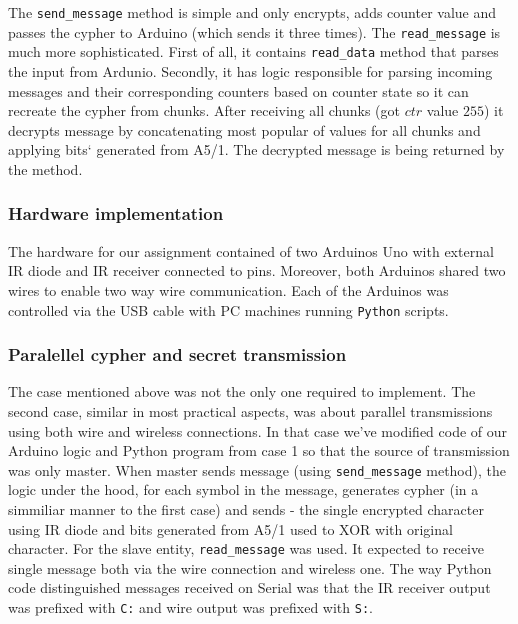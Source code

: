  The \texttt{send\_message} method is simple and only encrypts, adds counter value and passes the cypher to Arduino (which sends it three times). The \texttt{read\_message} is much more sophisticated. First of all, it contains \texttt{read\_data} method that parses the input from Ardunio. Secondly, it has logic responsible for parsing incoming messages and their corresponding counters based on counter state so it can recreate the cypher from chunks. After receiving all chunks (got $ctr$ value $255$) it decrypts message by concatenating most popular of values for all chunks and applying bits` generated from A5/1. The decrypted message is being returned by the method.


 \subsubsection{Hardware implementation}
The hardware for our assignment contained of two Arduinos Uno with external IR diode and IR receiver connected to pins. Moreover, both Arduinos shared two wires to enable two way wire communication. Each of the Arduinos was controlled via the USB cable with PC machines running \texttt{Python} scripts.


\subsubsection{Paralellel cypher and secret transmission}
The case mentioned above was not the only one required to implement. The second case, similar in most practical aspects, was about parallel transmissions using both wire and wireless connections. In that case we've modified code of our Arduino logic and Python program from case 1 so that the source of transmission was only master. When master sends message (using \texttt{send\_message} method), the logic under the hood, for each symbol in the message, generates cypher (in a simmiliar manner to the first case) and sends - the single encrypted character using IR diode and bits generated from A5/1 used to XOR with original character. For the slave entity, \texttt{read\_message} was used. It expected to receive single message both via the wire connection and wireless one. The way Python code distinguished messages received on Serial was that the IR receiver output was prefixed with \texttt{C:} and wire output was prefixed with \texttt{S:}.     